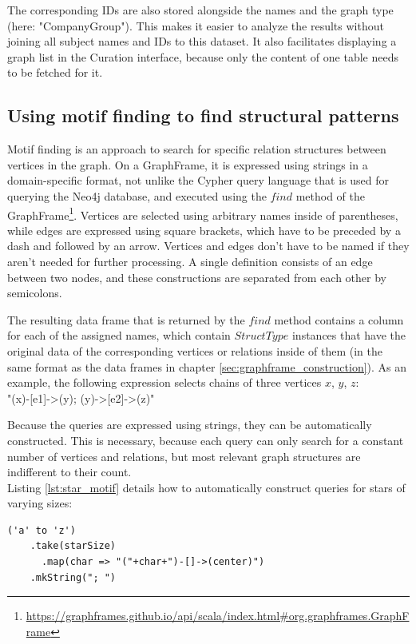 \documentclass[
  a4paper,     %
  titlepage,   %
  oneside,     %
  parskip      %
]{scrartcl}          %
\begin{document}
  The corresponding IDs are also stored alongside the names and the graph type (here: "CompanyGroup"). This makes it easier to analyze
  the results without joining all subject names and IDs to this dataset. It also facilitates displaying
  a graph list in the Curation interface, because only the content of one table needs to be fetched for it.

  \subsection{Using motif finding to find structural patterns}
  \label{sec:motif_finding}
  Motif finding is an approach to search for specific relation structures between
  vertices in the graph. On a GraphFrame, it is expressed using strings in a
  domain-specific format, not unlike the Cypher query language that is used for
  querying the Neo4j database, and executed using the $find$ method of the
  GraphFrame\footnote{\url{https://graphframes.github.io/api/scala/index.html\#org.graphframes.GraphFrame}}.
  Vertices are selected using arbitrary names inside of parentheses, while edges are
  expressed using square brackets, which have to be preceded by a dash and followed by
  an arrow. Vertices and edges don't have to be named if they aren't needed for further processing.
  A single definition consists of an edge between two nodes, and these constructions are
  separated from each other by semicolons.

  The resulting data frame that is returned by the $find$ method contains a column
  for each of the assigned names, which contain $StructType$ instances that have the original
  data of the corresponding vertices or relations inside of them
  (in the same format as the data frames in chapter \ref{sec:graphframe_construction}).
  As an example, the following expression selects chains of three vertices $x$, $y$, $z$:\\
  {\small\ttfamily "(x)-[e1]->(y); (y)->[e2]->(z)"}

  Because the queries are expressed using strings, they can be automatically constructed.
  This is necessary, because each query can only search for a constant number of
  vertices and relations, but most relevant graph structures are indifferent
  to their count.\\
  Listing \ref{lst:star_motif} details how to automatically construct queries for
  stars of varying sizes:

  \begin{lstlisting}[style=scalaStyle,caption=Star Motif Query Creation,label=lst:star_motif]
  ('a' to 'z')
    .take(starSize)
	  .map(char => "("+char+")-[]->(center)")
    .mkString("; ")
  \end{lstlisting}
\end{document}

